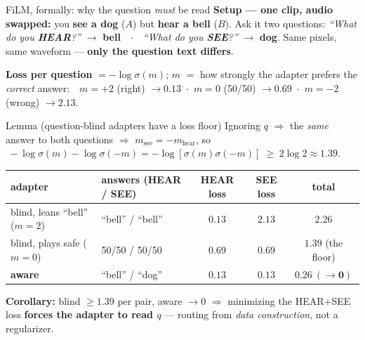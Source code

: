 \documentclass[aspectratio=169,11pt]{beamer}
\begin{document}
\begin{frame}{FiLM, formally: why the question \emph{must} be read}
{\footnotesize\textbf{Setup --- one clip, audio swapped:} you \textbf{see a dog} ($A$) but
\textbf{hear a bell} ($B$). Ask it two questions: \emph{``What do you \textbf{HEAR}?''} $\to$
\textbf{bell}\ \ $\cdot$\ \ \emph{``What do you \textbf{SEE}?''} $\to$ \textbf{dog}.
Same pixels, same waveform --- \textbf{only the question text differs}.}
\vspace{0.1em}
\par
{\scriptsize\textbf{Loss per question} $=-\log\sigma(m)$; $m$ $=$ how strongly the adapter prefers the
\emph{correct} answer:\ \ $m{=}{+}2$ (right) $\to 0.13$\ $\cdot$\ $m{=}0$ (50/50) $\to 0.69$\ $\cdot$\
$m{=}{-}2$ (wrong) $\to 2.13$.}
\vspace{0.1em}
\begin{center}
\begin{block}{Lemma (question-blind adapters have a loss floor)}
\scriptsize Ignoring $q$ $\Rightarrow$ the \emph{same} answer to both questions $\Rightarrow$
$m_{\text{see}}=-m_{\text{hear}}$, so
$\ -\log\sigma(m)-\log\sigma(-m)=-\log[\sigma(m)\sigma(-m)]\;\ge\;2\log 2\approx 1.39$.
\end{block}
\end{center}
\vspace{-0.2em}
\centering
\renewcommand{\arraystretch}{1.05}
{\scriptsize
\begin{tabular}{l l cc c}
\toprule
adapter & answers (HEAR / SEE) & HEAR loss & SEE loss & total \\
\midrule
blind, leans ``bell'' ($m{=}2$) & ``bell'' / ``bell'' & $0.13$ & $2.13$ & $2.26$ \\
blind, plays safe ($m{=}0$)     & 50/50 / 50/50       & $0.69$ & $0.69$ & $\mathbf{1.39}$ (the floor) \\
\textbf{aware}                  & ``bell'' / ``dog''  & $0.13$ & $0.13$ & $\mathbf{0.26\ (\to 0)}$ \\
\bottomrule
\end{tabular}}
\vspace{0.3em}
\par
{\footnotesize\textbf{Corollary:} blind $\ge 1.39$ per pair, aware $\to 0$ $\Rightarrow$ minimizing the
HEAR$+$SEE loss \textbf{forces the adapter to read $q$} --- routing from \emph{data construction}, not a regularizer.}
\end{frame}
\end{document}
